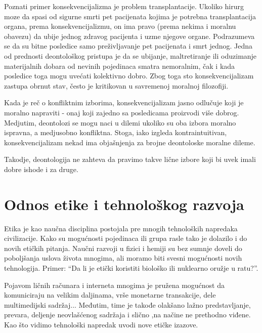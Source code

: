 \documentclass[a4paper]{article}
\begin{document}
Poznati primer konsekvencijalizma je problem transplantacije. Ukoliko hirurg moze da spasi od sigurne smrti pet pacijenata kojima je potrebna transplantacija organa, prema konsekvencijalizmu, on ima pravo (prema nekima i moralnu obavezu) da ubije jednog zdravog pacijenta i uzme njegove organe. Podrazumeva se da su bitne posledice samo preživljavanje pet pacijenata i smrt jednog.
Jedna od prednosti deontološkog pristupa je da se ubijanje, maltretiranje ili oduzimanje materijalnih dobara od nevinih pojedinaca smatra nemoralnim, čak i kada posledice toga mogu uvećati kolektivno dobro. Zbog toga sto konsekvencijalizam zastupa obrnut stav, često je kritikovan u savremenoj moralnoj filozofiji.

Kada je reč o konfliktnim izborima, konsekvencijalizam jasno odlučuje koji je moralno napraviti - onaj koji zajedno sa posledicama proizvodi više dobrog. Medjutim, deontolozi se mogu naci u dilemi ukoliko su oba izbora moralno ispravna, a medjusobno konfliktna. Stoga, iako izgleda kontraintuitivan, konsekvencijalizam nekad ima objašnjenja za brojne deontoloske moralne dileme.

Takodje, deontologija ne zahteva da pravimo takve lične izbore koji bi uvek imali dobre ishode i za druge. 


\section{Odnos etike i tehnološkog razvoja}

Etika je kao naučna disciplina postojala pre mnogih tehnoloških napredaka civilizacije. Kako su mogućnosti pojedinaca ili grupa rasle tako je dolazilo i do novih etičkih pitanja. Naučni razvoji u fizici i hemiji su bez sumnje doveli do poboljšanja uslova života mnogima, ali moramo biti svesni mogućnosti novih tehnologija. Primer: ``Da li je etički koristiti biološko ili nuklearno oružje u ratu?''.

Pojavom ličnih računara i interneta mnogima je pružena mogućnost da komuniciraju na velikim daljinama, vrše monetarne transakcije, dele multimedijski sadržaj... Međutim, time je takođe olakšano lažno predstavljanje, prevara, deljenje neovlašćenog sadržaja i slično ,na načine ne prethodno viđene.
Kao što vidimo tehnološki napredak uvodi nove etičke izazove.
\end{document}

